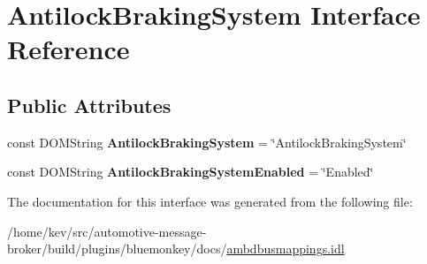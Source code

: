 \hypertarget{interfaceAntilockBrakingSystem}{\section{Antilock\+Braking\+System Interface Reference}
\label{interfaceAntilockBrakingSystem}
}
\subsection*{Public Attributes}
\begin{DoxyCompactItemize}
\item 
\hypertarget{interfaceAntilockBrakingSystem_ac981fc778ed33a1628e5702244449ec4}{const D\+O\+M\+String {\bfseries Antilock\+Braking\+System} = \char`\"{}Antilock\+Braking\+System\char`\"{}}\label{interfaceAntilockBrakingSystem_ac981fc778ed33a1628e5702244449ec4}

\item 
\hypertarget{interfaceAntilockBrakingSystem_af74f3f8205486fcc486715b924a8ab57}{const D\+O\+M\+String {\bfseries Antilock\+Braking\+System\+Enabled} = \char`\"{}Enabled\char`\"{}}\label{interfaceAntilockBrakingSystem_af74f3f8205486fcc486715b924a8ab57}

\end{DoxyCompactItemize}


The documentation for this interface was generated from the following file\+:\begin{DoxyCompactItemize}
\item 
/home/kev/src/automotive-\/message-\/broker/build/plugins/bluemonkey/docs/\hyperlink{ambdbusmappings_8idl}{ambdbusmappings.\+idl}\end{DoxyCompactItemize}
